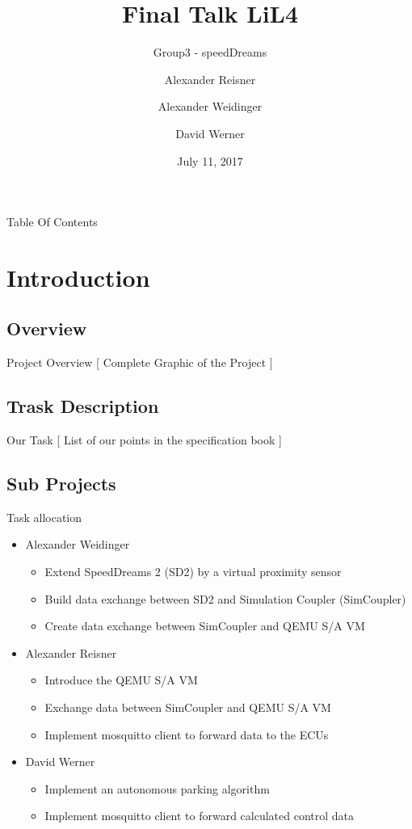 \documentclass[aspectratio=169]{beamer}
\title{Final Talk LiL4}
\subtitle{Group3 - speedDreams}
\date{July 11, 2017}
\author{Alexander Reisner \and
Alexander Weidinger \and
David Werner}
\institute{Technische Universität München}
\begin{document}
  \renewcommand{\figurename}{\tiny Fig.}
  \maketitle

\begin{frame}{Table Of Contents}
    \tableofcontents
  \end{frame}

  \section{Introduction}
  \subsection{Overview}
  \begin{frame}{Project Overview}
    [ Complete Graphic of the Project ]
  \end{frame}

  \subsection{Trask Description}
  \begin{frame}{Our Task}
    [ List of our points in the specification book ]
  \end{frame}

  \subsection{Sub Projects}
  \begin{frame}{Task allocation}
    \begin{itemize}
      \item Alexander Weidinger
      \begin{itemize}
        \item Extend SpeedDreams 2 (SD2) by a virtual proximity sensor
        \item Build data exchange between SD2 and Simulation Coupler (SimCoupler)
        \item Create data exchange between SimCoupler and QEMU S/A VM
      \end{itemize}
      \item Alexander Reisner
      \begin{itemize}
        \item Introduce the QEMU S/A VM
        \item Exchange data between SimCoupler and QEMU S/A VM
        \item Implement mosquitto client to forward data to the ECUs
      \end{itemize}
      \item David Werner
      \begin{itemize}
        \item Implement an autonomous parking algorithm
        \item Implement mosquitto client to forward calculated control data
      \end{itemize}
    \end{itemize}
  \end{frame}
\end{document}
